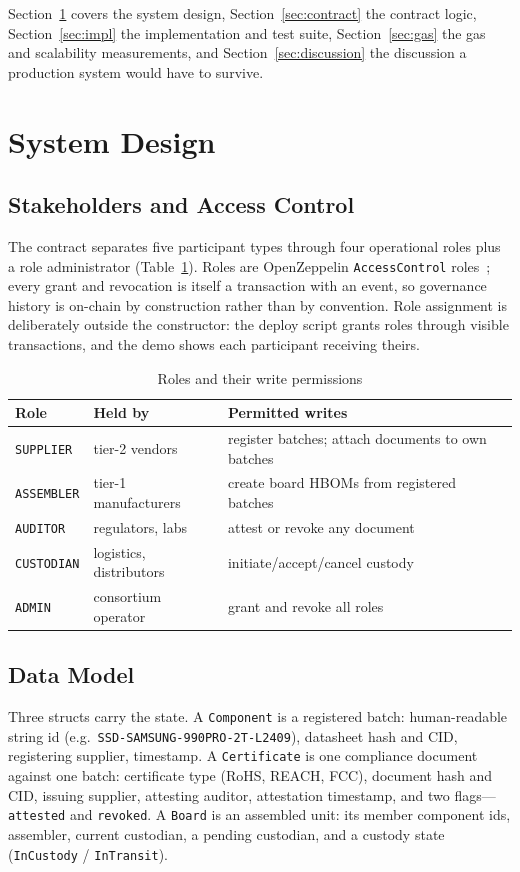 \documentclass[conference]{IEEEtran}
\begin{document}
Section~\ref{sec:design} covers the system design, Section~\ref{sec:contract} the contract logic, Section~\ref{sec:impl} the implementation and test suite, Section~\ref{sec:gas} the gas and scalability measurements, and Section~\ref{sec:discussion} the discussion a production system would have to survive.

\section{System Design}\label{sec:design}

\subsection{Stakeholders and Access Control}
The contract separates five participant types through four operational roles plus a role administrator (Table~\ref{tab:roles}). Roles are OpenZeppelin \texttt{AccessControl} roles~\cite{oz}; every grant and revocation is itself a transaction with an event, so governance history is on-chain by construction rather than by convention. Role assignment is deliberately outside the constructor: the deploy script grants roles through visible transactions, and the demo shows each participant receiving theirs.

\begin{table}[!t]
\caption{Roles and their write permissions}
\label{tab:roles}
\centering
\begin{tabular}{@{}l l l@{}}
\toprule
Role & Held by & Permitted writes \\
\midrule
\texttt{SUPPLIER} & tier-2 vendors & register batches; attach documents to own batches \\
\texttt{ASSEMBLER} & tier-1 manufacturers & create board HBOMs from registered batches \\
\texttt{AUDITOR} & regulators, labs & attest or revoke any document \\
\texttt{CUSTODIAN} & logistics, distributors & initiate/accept/cancel custody \\
\texttt{ADMIN} & consortium operator & grant and revoke all roles \\
\bottomrule
\end{tabular}
\end{table}

\subsection{Data Model}
Three structs carry the state. A \texttt{Component} is a registered batch: human-readable string id (e.g.\ \texttt{SSD-SAMSUNG-990PRO-2T-L2409}), datasheet hash and CID, registering supplier, timestamp. A \texttt{Certificate} is one compliance document against one batch: certificate type (RoHS, REACH, FCC), document hash and CID, issuing supplier, attesting auditor, attestation timestamp, and two flags---\texttt{attested} and \texttt{revoked}. A \texttt{Board} is an assembled unit: its member component ids, assembler, current custodian, a pending custodian, and a custody state (\texttt{InCustody} / \texttt{InTransit}).
\end{document}
